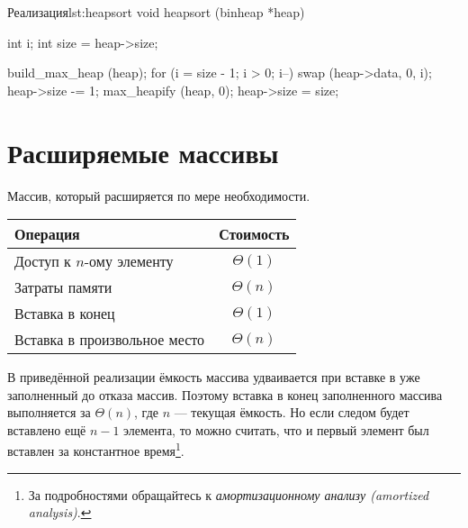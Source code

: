 \begin{clst}{Реализация}{lst:heapsort}
void heapsort (binheap *heap) {
  int i;
  int size = heap->size;

  build_max_heap (heap);
  for (i = size - 1; i > 0; i--) {
    swap (heap->data, 0, i);
    heap->size -= 1;
    max_heapify (heap, 0);
  }
  heap->size = size;
}
\end{clst}

\section{Расширяемые массивы}
\label{sec:ext-arrays}

Массив, который расширяется по мере необходимости.
\begin{center}
  \begin{tabular}{lc}
    \toprule
    Операция & Стоимость \\
    \midrule
    Доступ к $n$-ому элементу & $\Theta(1)$ \\
    Затраты памяти & $\Theta(n)$ \\
    Вставка в конец & $\Theta(1)$ \\
    Вставка в произвольное место & $\Theta(n)$ \\
    \bottomrule
  \end{tabular}
\end{center}

В приведённой реализации ёмкость массива удваивается при вставке в уже заполненный до отказа массив. Поэтому вставка в конец заполненного массива выполняется за $\Theta(n)$, где $n$ — текущая ёмкость. Но если следом будет вставлено ещё $n - 1$ элемента, то можно считать, что и первый элемент был вставлен за константное время\footnote{За подробностями обращайтесь к \emph{амортизационному анализу (amortized analysis)}.}.


